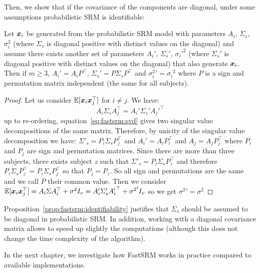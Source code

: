 Then, we show that if the covariance of the components are diagonal, under some
assumptions probabilistic SRM is identifiable:
\begin{prop}
  \label{prop:fastsrm:identifiability}
  Let $\boldsymbol{x}_i$ be generated from the probabilistic SRM model with parameters 
  $A_i$, $\Sigma_s$, $\sigma_i^2$ (where $\Sigma_s$ is diagonal positive with
  distinct values on the diagonal) and assume there exists another set of parameters $A_i'$, $\Sigma_s'$,
  ${\sigma_i'}^2$ (where $\Sigma_s'$ is diagonal positive with
  distinct values on the diagonal) that also generate $\boldsymbol{x}_i$.
Then if $m\geq 3$, $A_i' = A_i P^{\top}$, $\Sigma_s'= P\Sigma_sP^{\top}$ and
  ${\sigma_i^2}' = {\sigma_i}^2$ where $P$ is a sign and permutation matrix
  independent (the same for all subjects).
\end{prop}
\begin{proof}
  Let us consider $\mathbb{E}[\boldsymbol{x}_i \boldsymbol{x}_j^{\top}]$ for $i \neq j$.
  We have:
  \begin{equation}
  A_i \Sigma_s A_j^{\top} = A_i' \Sigma_s' {A_j'}^{\top}
  \label{eq:fastsrm:svd}
  \end{equation}
  up to re-ordering, equation~\eqref{eq:fastsrm:svd} gives two singular value
  decompositions of the same matrix.
  Therefore, by unicity of the singular value decomposition we have:
  $\Sigma'_s = P_i \Sigma_s P_j^{\top}$ and $A_i' = A_i P_i^{\top}$ and $A_j =
  A_j P_j^{\top}$ where $P_i$ and $P_j$ are sign and permutation matrices.
  Since there are more than three subjects, there exists subject $z$ such that
  $\Sigma'_s = P_i \Sigma_s P_z^{\top}$ and therefore
  $P_i \Sigma_s P_z^{\top} =  P_i \Sigma_s P_j^{\top}$ so that $P_j =
  P_z$. So all sign and permutations are the same and we call $P$ their
  common value.
  Then we consider
  $\mathbb{E}[\boldsymbol{x}_i \boldsymbol{x}_j^{\top}] = A_i \Sigma A_i^{\top} + \sigma^2 I_v = A_i' \Sigma_s'
  {A_i'}^{\top} + {\sigma^2}' I_v$
  so we get ${\sigma^2}' = {\sigma^2}$
\end{proof}

Proposition~\eqref{prop:fastsrm:identifiability} justifies that
$\Sigma_s$ should be assumed to be diagonal in probabilistic SRM.
In addition, working with a diagonal covariance matrix allows to speed up
slightly the computations (although this does not change the time complexity of
the algorithm).

In the next chapter, we investigate how FastSRM works in practice compared to
available implementations.
